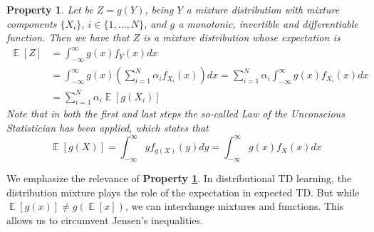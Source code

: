 \documentclass[12pt,a4paper,openright,twoside]{article}
\DeclareMathOperator*{\E}{\mathbb{E}}
\numberwithin{equation}{section}
\theoremstyle{definition}
\theoremstyle{remark}
\theoremstyle{plain}
\newtheorem{mixtureProperty}{Property}
\begin{document}
\begin{mixtureProperty} \label{mixtureProperty3}
	Let be $Z=g(Y)$, being $Y$ a mixture distribution with mixture components $\{X_i\}$, $i\in \{1, \dots, N\}$, and $g$ a monotonic, invertible and differentiable function. Then we have that $Z$ is a mixture distribution whose expectation is
    \begin{equation} \label{mixtureProperty3eq}
        \begin{split}
        \E [Z] &= \int_{-\infty}^{\infty} g(x) f_{Y}(x) dx \\
        &= \int_{-\infty}^{\infty} g(x) \left( \sum_{i=1}^{N} \alpha_i f_{X_i}(x)\right) dx = \sum_{i=1}^{N} \alpha_i \int_{-\infty}^{\infty} g(x) f_{X_i}(x) dx \\
        &= \sum_{i=1}^{N} \alpha_i \E [g(X_i)]
        \end{split}
    \end{equation}
    Note that in both the first and last steps the so-called Law of the Unconscious Statistician has been applied, which states that
    \begin{equation} \label{LOTUS}
    	\E [g(X)] = \int_{-\infty}^{\infty} y f_{g(X)}(y) dy  = \int_{-\infty}^{\infty} g(x) f_{X}(x) dx
    \end{equation}

\end{mixtureProperty}

We emphasize the relevance of \textbf{Property \ref{mixtureProperty3}}. In distributional TD learning, the distribution mixture plays the role of the expectation in expected TD. But while $\E[g(x)] \not= g(\E[x])$, we can interchange mixtures and functions. This allows us to circumvent Jensen's inequalities.

\end{document}
